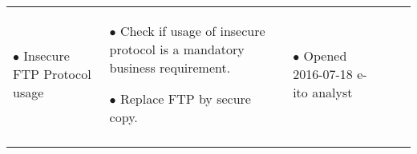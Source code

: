 \begin{table}[H]
\begin{tabularx}{1\textwidth}{p{4.2cm}!{\color{white}\vline} p{3.2cm}!{\color{white}\vline} p{4.6cm}!{\color{white}\vline} p{5.4cm}!{\color{white}\vline} p{5.6cm}}
	\begin{citemize}[leftmargin=*]							%
                \item[$\bullet$] Insecure FTP Protocol usage
        \end{citemize} &
	
	\begin{citemize}[leftmargin=*]							%
                \item[$\bullet$] Check if usage of insecure protocol is a mandatory business requirement.
		\item[$\bullet$] Replace FTP by secure copy.
        \end{citemize} &
	
	\begin{citemize}[leftmargin=*]							%
                \item[$\bullet$] Opened 2016-07-18 e-ito analyst
        \end{citemize} \\
\hline

\end{tabularx}

\end{table}
